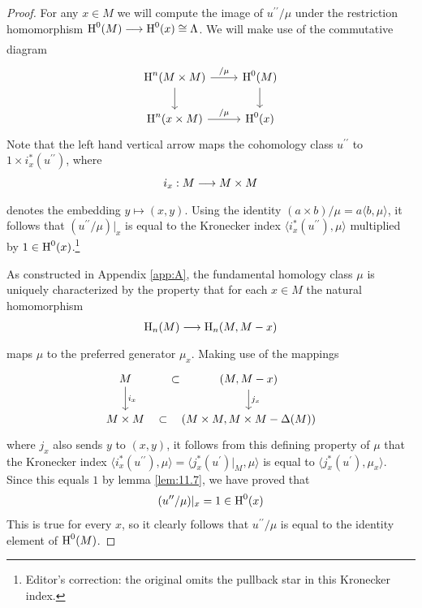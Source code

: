 \documentclass[../main]{subfiles}
\begin{document}
\begin{proof} For any $x \in M$ we will compute the image of $u^{\prime \prime} / \mu$ under the restriction homomorphism $\homology^{0}(M) \varrightarrow{} \homology^{0}(x) \cong \Lambda$. We will make use of the commutative diagram
\[\begin{tikzcd}
\homology^n(M\times M) \arrow[r,"/\mu"] \arrow[d] & \homology^0(M)\arrow[d]\\ \homology^n(x\times M) \arrow[r, "/\mu"]& \homology^0(x)
\end{tikzcd}\]
Note that the left hand vertical arrow maps the cohomology class $u^{\prime \prime}$ to $1 \times i_{x}^{*}(u^{\prime \prime})$, where
\[
i_{x}: M \varrightarrow{} M \times M
\]
denotes the embedding $y \mapsto(x, y)$. Using the identity $(a \times b) / \mu=a\langle b, \mu\rangle$, it follows that $(u^{\prime \prime} / \mu) |_x$ is equal to the Kronecker index $\langle i_{x}^*(u^{\prime \prime}), \mu\rangle$ multiplied by $1 \in \operatorname{H}^{0}(x)$.\footnote{Editor's correction: the original omits the pullback star in this Kronecker index.}

As constructed in Appendix \ref{app:A}, the fundamental homology class $\mu$ is uniquely characterized by the property that for each $x \in M$ the natural homomorphism
\[
\homology_{n}(M) \varrightarrow{} \homology_{n}(M, M-x)
\]
maps $\mu$ to the preferred generator $\mu_{x}$. Making use of the mappings
\[\begin{tikzcd}
M \arrow[r,phantom , "\subset"]\arrow[d,"i_x"] &(M,M-x)\arrow[d,"j_x"]\\ M\times M \arrow[r,phantom, "\subset"] &(M\times M, M\times M -\Delta(M))
\end{tikzcd}\]
where $j_{x}$ also sends $y$ to $(x, y)$, it follows from this defining property of $\mu$ that the Kronecker index $\langle i_{x}^{*}(u^{\prime \prime}), \mu\rangle=\langle j_{x}^{*}(u^{\prime})|_M, \mu\rangle$ is equal to $\langle j_{x}^{*}(u^{\prime}), \mu_{x}\rangle$. Since this equals $1$ by lemma \ref{lem:11.7}, we have proved that
\[
(u^{\prime \prime} / \mu)|_x=1 \in \operatorname{H}^{0}(x)
\]
This is true for every $x$, so it clearly follows that $u^{\prime \prime} / \mu$ is equal to the identity element of $\operatorname{H}^{0}(M)$.
\end{proof}
\end{document}
